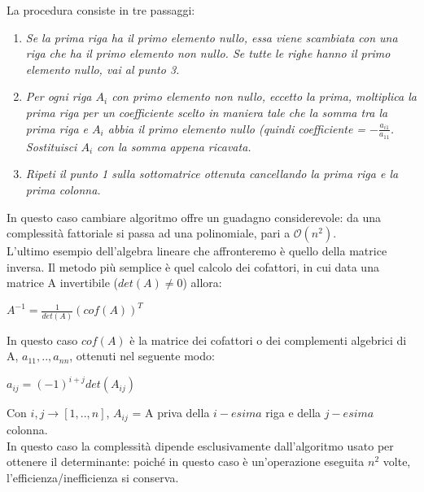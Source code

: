 \newpage
\noindent La procedura consiste in tre passaggi:
\begin{enumerate}
\item{\textit{Se la prima riga ha il primo elemento nullo, essa viene scambiata con una riga che ha il primo elemento non nullo. Se tutte le righe hanno il primo elemento nullo, vai al punto 3.\\}}
\item{\textit{Per ogni riga $A_{i}$ con primo elemento non nullo, eccetto la prima, moltiplica la prima riga per un coefficiente scelto in maniera tale che la somma tra la prima riga e $A_{i}$ abbia il primo elemento nullo (quindi coefficiente = $-\frac{a_{i1}}{a_{11}}$. Sostituisci $A_{i}$ con la somma appena ricavata.\\}}
\item{\textit{Ripeti il punto 1 sulla sottomatrice ottenuta cancellando la prima riga e la prima colonna.}}
\\
\end{enumerate}
In questo caso cambiare algoritmo offre un guadagno considerevole: da una complessità fattoriale si passa ad una polinomiale, pari a $\mathcal{O}(n^2)$.\\
L'ultimo esempio dell'algebra lineare che affronteremo è quello della matrice inversa. Il metodo più semplice è quel calcolo dei cofattori, in cui data una matrice A invertibile ($det(A) \neq 0$) allora:
\begin{center}
{$A^{-1} = \frac{1}{det(A)}(cof(A))^T$\\}
\end{center}
In questo caso $cof(A)$ è la matrice dei cofattori o dei complementi algebrici di A, $a_{11},.., a_{nn}$, ottenuti nel seguente modo:
\begin{center}
{$a_{ij} = (-1)^{i+j} det(A_{ij})$ \\}
\end{center}
Con $i,j\rightarrow[1,..,n]$, $A_{ij}$ = A priva della $i-esima$ riga e della $j-esima$ colonna.\\
In questo caso la complessità dipende esclusivamente dall'algoritmo usato per ottenere il determinante: poiché in questo caso è un'operazione eseguita $n^2$ volte, l'efficienza/inefficienza si conserva.

